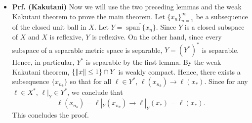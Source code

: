 \documentclass{article}
\begin{document}
\begin{itemize}
	\begin{solutions}
		Our goal is to show that given $m \in Y^{\ast\ast}$, there exists some $y \in Y$ so that for all $\ell \in Y^{\ast}$, $m(\ell) = \ell(y)$. Note that the map $\ell \mapsto \ell|_{Y}$ defines a map from $X^{\ast}$ to $Y^{\ast}$. So consider the map $X^{\ast} \ni \ell \mapsto m(\ell|_{Y})$, which defines an element in $X^{\ast}$. Since $X$ is reflexive, there exists an $x_{0} \in X$ such that $m(\ell|_{Y}) = \ell(x_{0})$ for all $\ell \in X^{\ast}$. We must show the following: 
			\begin{enumerate}[itemsep =-2pt,label= (\arabic{*})]
				\item $x_{0} \in Y$;
				\item for all $\ti{\ell} \in Y^{\ast}$, $m(\ti{\ell}) = \ti{\ell}(x_{0})$. 
			\end{enumerate}
		Let us prove each claim individually. 
			\begin{enumerate}[itemsep =-2pt,label = (\arabic{*})]
				\item Assume to the contrary that $x_{0}\notin Y$. Then there exists some $\ell \in X^{\ast}$ so that $\ell|_{Y} = 0$ and $\ell(x_{0}) \neq 0$ (by Hahn-Banach). But this is impossible by the line defining $x_{0}$. Hence, $x_{0}\in Y$. 
				\item Consider $\ti{\ell} \in Y^{\ast}$. Then by Hahn-Banach, we can produce some $\ell \in X^{\ast}$ such that $\ell|_{Y} = \ti{\ell}$. Hence, $m(\ti{\ell}) = m(\ell|_{Y}) = \ell(x) = \ti{\ell}(x_{0})$. 
			\end{enumerate}
		Hence, the proof concludes. 
	\end{solutions} 
	
	\item \textbf{Prf. (Kakutani)} Now we will use the two preceding lemmas and the weak Kakutani theorem to prove the main theorem. Let $\{x_{n}\}_{n= 1}^{\infty}$ be a subsequence of the closed unit ball in $X$. Let $Y = \overline{\operatorname{span}\{x_{n}\}}$. Since $Y$ is a closed subspace of $X$ and $X$ is reflexive, $Y$ is reflexive. On the other hand, since every subspace of a separable metric space is separable, $Y = (Y^{\ast})^{\ast}$ is separable. Hence, in particular, $Y^{\ast}$ is separable by the first lemma. By the weak Kakutani theorem, $\{\left\Vert x \right\Vert \leq 1\} \cap Y$ is weakly compact. Hence, there exists a subsequence $\{x_{n_{k}}\}$ so that for all $\ell \in Y^{\ast}$, $\ell(x_{n_{k}}) \to \ell(x_{\ast})$. Since for any $\ell \in X^{\ast}$, $\ell|_{Y} \in Y^{\ast}$, we conclude that 
		\begin{equation}
			\ell(x_{n_{k}}) = \ell|_{Y}(x_{n_{k}}) \longrightarrow \ell|_{Y}(x_{\ast}) = \ell(x_{\ast}). 
		\end{equation} 
	This concludes the proof. 
\end{itemize}
\end{document}

